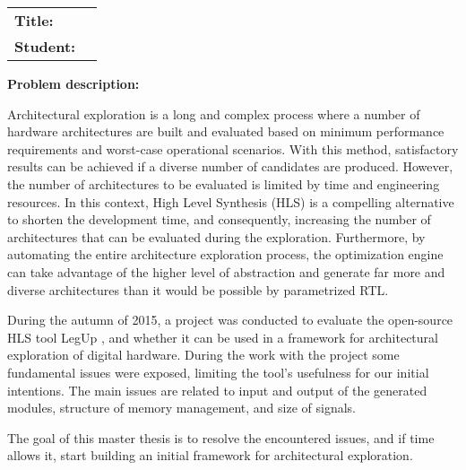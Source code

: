 \begin{titlingpage}

\noindent
\begin{tabular}{@{}p{4cm}p{8cm}}
\textbf{Title:} 	& \thetitle \\
\textbf{Student:}	& \theauthor \\
\end{tabular}

\vspace{6ex}
\noindent\textbf{Problem description:}
\vspace{4ex}

Architectural exploration is a long and complex process where a number of hardware architectures are built and evaluated based on minimum performance requirements and worst-case operational scenarios. With this method, satisfactory results can be achieved if a diverse number of candidates are produced. However, the number of architectures to be evaluated is limited by time and engineering resources. In this context, High Level Synthesis (HLS) is a compelling alternative to shorten the development time, and consequently, increasing the number of architectures that can be evaluated during the exploration. Furthermore, by automating the entire architecture exploration process, the optimization engine can take advantage of the higher level of abstraction and generate far more and diverse architectures than it would be possible by parametrized RTL.

During the autumn of 2015, a project was conducted to evaluate the open-source HLS tool LegUp \cite{holm2015pro}, and whether it can be used in a framework for architectural exploration of digital hardware. During the work with the project some fundamental issues were exposed, limiting the tool’s usefulness for our initial intentions. The main issues are related to input and output of the generated modules, structure of memory management, and size of signals.

The goal of this master thesis is to resolve the encountered issues, and if time allows it, start building an initial framework for architectural exploration.


\end{titlingpage}
